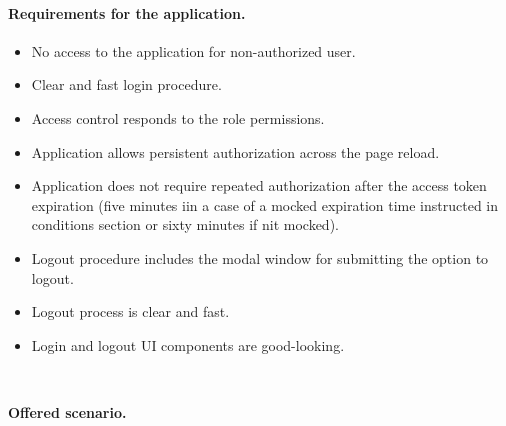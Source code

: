 \paragraph*{Requirements for the application.} 
\begin{itemize}
    \item No access to the application for non-authorized user.
    \item Clear and fast login procedure.
    \item Access control responds to the role permissions.
    \item Application allows persistent authorization across the page reload.
    \item Application does not require repeated authorization after the access token expiration (five minutes iin a case of a mocked expiration time instructed in conditions section or sixty minutes if nit mocked).
    \item Logout procedure includes the modal window for submitting the option to logout.
    \item Logout process is clear and fast.
    \item Login and logout UI components are good-looking.
\end{itemize}

\

\noindent \textbf{Offered scenario.} 

